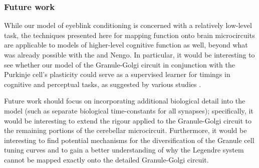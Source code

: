 \subsubsection{Future work}
While our model of eyeblink conditioning is concerned with a relatively low-level task, the techniques presented here for mapping function onto brain microcircuits are applicable to models of higher-level cognitive function as well, beyond what was already possible with the \NEF and Nengo.
In particular, it would be interesting to see whether our model of the Granule-Golgi circuit in conjunction with the Purkinje cell's plasticity could serve as a supervised learner for timings in cognitive and perceptual tasks, as suggested by various studies \citep{oreilly2008cerebellum,e2014metaanalysis,sanger2020expansion}.

Future work should focus on incorporating additional biological detail into the model (such as separate biological time-constants for all synapses); specifically, it would be interesting to extend the rigour applied to the Granule-Golgi circuit to the remaining portions of the cerebellar microcircuit.
Furthermore, it would be interesting to find potential mechanisms for the diversification of the Granule cell tuning curves and to gain a better understanding of why the Legendre system cannot be mapped exactly onto the detailed Granule-Golgi circuit.